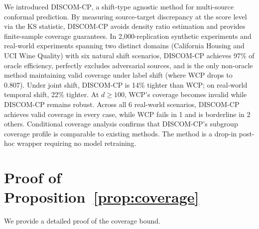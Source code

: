 \documentclass{article}
\newcommand{\DISCOM}{\textsc{DISCOM-CP}}
\begin{document}
We introduced \DISCOM{}, a shift-type agnostic method for multi-source conformal prediction. By measuring source-target discrepancy at the score level via the KS statistic, \DISCOM{} avoids density ratio estimation and provides finite-sample coverage guarantees. In 2{,}000-replication synthetic experiments and real-world experiments spanning two distinct domains (California Housing and UCI Wine Quality) with six natural shift scenarios, \DISCOM{} achieves 97\% of oracle efficiency, perfectly excludes adversarial sources, and is the only non-oracle method maintaining valid coverage under label shift (where WCP drops to 0.807). Under joint shift, \DISCOM{} is 14\% tighter than WCP; on real-world temporal shift, 22\% tighter. At $d \geq 100$, WCP's coverage becomes invalid while \DISCOM{} remains robust. Across all 6 real-world scenarios, \DISCOM{} achieves valid coverage in every case, while WCP fails in 1 and is borderline in 2 others. Conditional coverage analysis confirms that \DISCOM{}'s subgroup coverage profile is comparable to existing methods. The method is a drop-in post-hoc wrapper requiring no model retraining.




\newpage
\appendix

\section{Proof of Proposition~\ref{prop:coverage}}
\label{app:proof}

We provide a detailed proof of the coverage bound.
\end{document}
